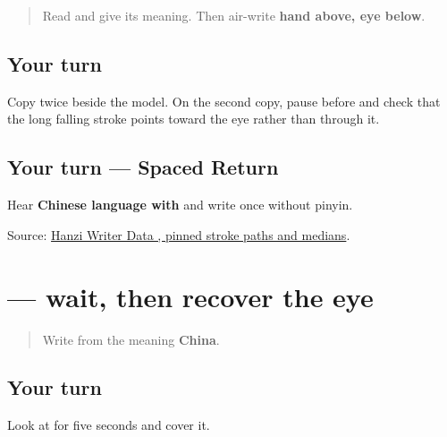 \label{lesson:ZH-W18-kan-guided}



\begin{quote}
Read \textbf{} and give its meaning. Then air-write \textbf{hand above, eye below}.
\end{quote}

\subsection*{Your turn}

Copy \textbf{} twice beside the model. On the second copy, pause before \textbf{} and check that the long falling stroke points toward the eye rather than through it.

\subsection*{Your turn — Spaced Return}
Hear \textbf{Chinese language with } and write  once without pinyin.

\begin{tcolorbox}[breakable,colback=teal!4,colframe=teal!35!black,title={Before you move on}]
Source: \href{https://raw.githubusercontent.com/chanind/hanzi-writer-data/68d10a4b21150cae5e1ebbd223eed289cf32d90c/data/\%E7\%9C\%8B.json}{Hanzi Writer Data , pinned stroke paths and medians}.
\end{tcolorbox}
\section[\texorpdfstring{\zh{看} (kàn)}{看 (kàn)}]{ — wait, then recover the eye}

\label{lesson:ZH-W18-kan-delayed}



\begin{quote}
Write \textbf{} from the meaning \textbf{China}.
\end{quote}

\subsection*{Your turn}

Look at \textbf{} for five seconds and cover it.

